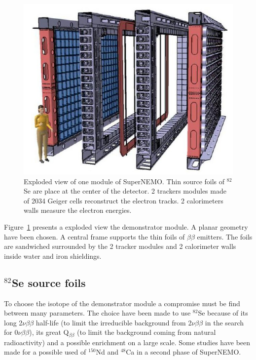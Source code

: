 \documentclass[main.tex]{subfiles}
\begin{document}
\begin{figure}[h!]
\begin{center}
\includegraphics[scale=0.55]{pictures/Chap3/snemomodule.png}
\caption{Exploded view of one module of SuperNEMO. Thin source foils of $^{\text{82}}$Se are place at the center of the detector. 2 trackers modules made of 2034 Geiger cells reconstruct the electron tracks. 2 calorimeters walls measure the electron energies.}
\label{SuperNEMOexplodedView}
\end{center}
\end{figure}


\NI Figure~\ref{SuperNEMOexplodedView} presents a exploded view the demonstrator module. A planar geometry have been chosen. A central frame supports the thin foils of $\beta\beta$ emitters. The foils are sandwiched surrounded by the 2 tracker modules and 2 calorimeter walls inside water and iron shieldings. 


\FloatBarrier


\subsection{$^{\text{82}}$Se source foils}


\NI To choose the isotope of the demonstrator module a compromise must be find between many parameters. The choice have been made to use $^{\text{82}}$Se because of  its long 2$\nu\beta\beta$ half-life (to limit the irreducible background from 2$\nu\beta\beta$ in the search for 0$\nu\beta\beta$), its great Q$_{\beta\beta}$ (to limit the background coming from natural radioactivity) and a possible enrichment on a large scale. Some studies have been made for a possible used of $^{\text{150}}$Nd and $^{\text{48}}$Ca in a second phase of SuperNEMO.
\end{document}
